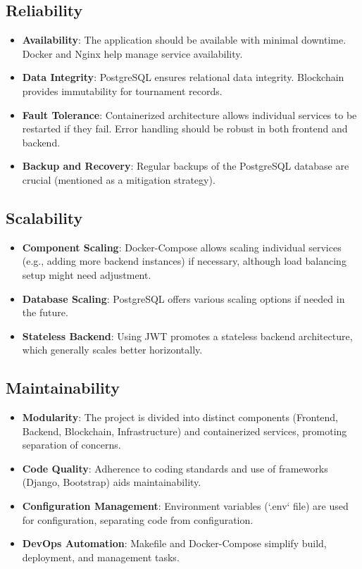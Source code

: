 \subsection*{Reliability}
\begin{itemize}
    \item \textbf{Availability}: The application should be available with minimal downtime. Docker and Nginx help manage service availability.
    \item \textbf{Data Integrity}: PostgreSQL ensures relational data integrity. Blockchain provides immutability for tournament records.
    \item \textbf{Fault Tolerance}: Containerized architecture allows individual services to be restarted if they fail. Error handling should be robust in both frontend and backend.
    \item \textbf{Backup and Recovery}: Regular backups of the PostgreSQL database are crucial (mentioned as a mitigation strategy).
\end{itemize}

\subsection*{Scalability}
\begin{itemize}
    \item \textbf{Component Scaling}: Docker-Compose allows scaling individual services (e.g., adding more backend instances) if necessary, although load balancing setup might need adjustment.
    \item \textbf{Database Scaling}: PostgreSQL offers various scaling options if needed in the future.
    \item \textbf{Stateless Backend}: Using JWT promotes a stateless backend architecture, which generally scales better horizontally.
\end{itemize}

\subsection*{Maintainability}
\begin{itemize}
    \item \textbf{Modularity}: The project is divided into distinct components (Frontend, Backend, Blockchain, Infrastructure) and containerized services, promoting separation of concerns.
    \item \textbf{Code Quality}: Adherence to coding standards and use of frameworks (Django, Bootstrap) aids maintainability.
    \item \textbf{Configuration Management}: Environment variables (`.env` file) are used for configuration, separating code from configuration.
    \item \textbf{DevOps Automation}: Makefile and Docker-Compose simplify build, deployment, and management tasks.
\end{itemize}

